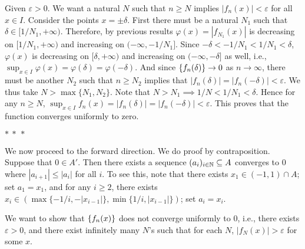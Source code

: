 \documentclass[12pt]{article}
\begin{document}
\begin{fproof}[1(b)]
    Given \(\varepsilon>0\).
    We want a natural \(N\) such that \(n \geq N\) implies \(|f_n(x)| < \varepsilon\) for all \(x \in I\).
    Consider the points \(x = \pm\delta\).
    First there must be a natural \(N_1\) such that \(\delta \in [1/N_1, +\infty)\).
    Therefore, by previous results \(\varphi(x) = |f_{N_1}(x)|\) is decreasing on \([1/N_1, +\infty)\) and increasing on \((-\infty, -1/N_1]\).
    Since \(-\delta <-1/N_1 < 1/N_1 < \delta\), \(\varphi(x)\) is decreasing on \([\delta, +\infty)\) and increasing on \((-\infty, -\delta]\) as well, i.e., \(\sup_{x \in I} \varphi(x) = \varphi(\delta) = \varphi(-\delta).\)
    And since \(\left\{ f_n(\delta) \right\} \to 0\) as \(n \to \infty\), there must be another \(N_2\) such that \(n \geq N_2\) implies that \(|f_n(\delta)|=|f_n(-\delta)| < \varepsilon \). 
    We thus take \(N > \max\{N_1, N_2\}\).
    Note that \(N > N_1 \implies 1/N < 1/N_1 < \delta\).
    Hence for any \(n \geq N\), \(\sup_{x\in I} f_n(x) = |f_n(\delta)| = |f_n(-\delta)| < \varepsilon\).
    This proves that the function converges uniformly to zero.

    \begin{center}
        \(\ast~\ast~\ast\)
    \end{center}
    
    We now proceed to the forward direction.
    We do proof by contraposition.
    Suppose that \(0 \in A'\).
    Then there exists a sequence \((a_i)_{i \in \mathbb {N}} \subseteq A\) converges to 0 where \(|a_{i+1}| \leq |a_i|\) for all \(i\).
    To see this, note that there exists \(x_1 \in (-1, 1) \cap A\); set \(a_1 = x_1\), and for any \(i \geq 2\), there exists \(x_i \in (\max\{-1/i, -|x_{i-1}|\}, \min\{1/i, |x_{i-1}|\})\); set \(a_i = x_i\).

    We want to show that \(\left\{ f_n(x) \right\}\) does not converge uniformly to \(0\), i.e., there exists \(\varepsilon > 0\), and there exist infinitely many \(N\)'s such that for each \(N\), \(|f_N(x)| > \varepsilon\) for some \(x\).


\end{fproof}
\end{document}
